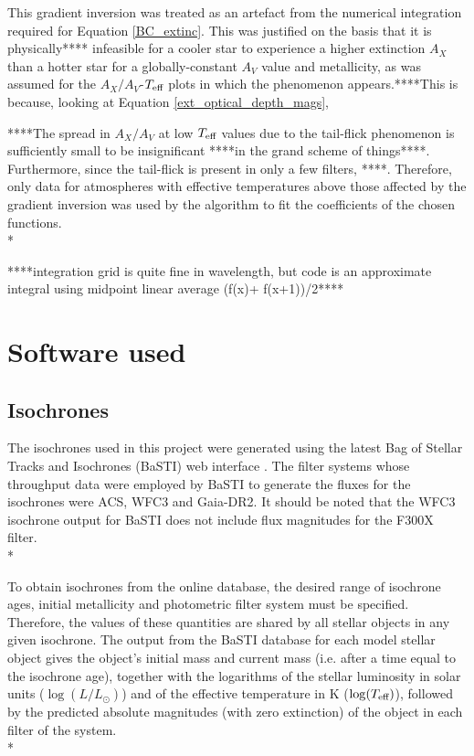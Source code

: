 \documentclass[12pt, a4paper]{report}
\begin{document}
This gradient inversion was treated as an artefact from the numerical integration required for Equation \ref{BC_extinc}. This was justified on the basis that it is physically**** infeasible for a cooler star to experience a higher extinction $A_{X}$ than a hotter star for a globally-constant $A_{V}$ value and metallicity, as was assumed for the $A_{X}/A_{V}$-$T_{\textnormal{eff}}$ plots in which the phenomenon appears.****This is because, looking at Equation \ref{ext_optical_depth_mags},

****The spread in $A_{X}/A_{V}$ at low $T_{\textnormal{eff}}$ values due to the tail-flick phenomenon is sufficiently small to be insignificant ****in the grand scheme of things****. Furthermore, since the tail-flick is present in only a few filters, ****. Therefore, only data for atmospheres with effective temperatures above those affected by the gradient inversion was used by the algorithm to fit the coefficients of the chosen functions.\\*

****integration grid is quite fine in wavelength, but code is an approximate integral using midpoint linear average (f(x)+ f(x+1))/2****


\section{Software used}
\subsection{Isochrones}
The isochrones used in this project were generated using the latest Bag of Stellar Tracks and Isochrones (BaSTI) web interface \citep{2004ApJ...612..168P,2018ApJ...856..125H}. The filter systems whose throughput data were employed by BaSTI to generate the fluxes for the isochrones were ACS, WFC3 and Gaia-DR2. It should be noted that the WFC3 isochrone output for BaSTI does not include flux magnitudes for the F300X filter.\\*

To obtain isochrones from the online database, the desired range of isochrone ages, initial metallicity and photometric filter system must be specified. Therefore, the values of these quantities are shared by all stellar objects in any given isochrone. The output from the BaSTI database for each model stellar object gives the object's initial mass and current mass (i.e. after a time equal to the isochrone age), together with the logarithms of the stellar luminosity in solar units ($\log(L/L_{\odot})$) and of the effective temperature in K ($\log(T_{\textnormal{eff}})$), followed by the predicted absolute magnitudes (with zero extinction) of the object in each filter of the system. \\*
\end{document}
